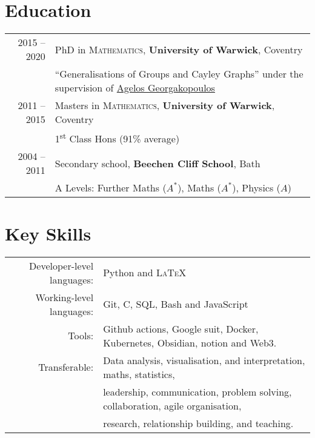 \documentclass[a4paper,10pt]{article}
\begin{document}
\section{Education}
\begin{tabular}{rl}
	\textsc{} 2015 -- 2020 & PhD in \textsc{Mathematics}, \textbf{University of Warwick}, Coventry\\
	& ``Generalisations of Groups and Cayley Graphs'' under the supervision of \href{https://homepages.warwick.ac.uk/~maslar/}{Agelos Georgakopoulos}\\
	\textsc{} 2011 -- 2015& Masters in \textsc{Mathematics}, \textbf{University of Warwick}, Coventry\\
	& 1\textsuperscript{st} Class Hons (91\% average)\\
	\textsc{} 2004 -- 2011& Secondary school, \textbf{Beechen Cliff School}, Bath\\
	&  A Levels: Further Maths ($A^{\ast}$), Maths ($A^{\ast}$), Physics ($A$)
\end{tabular}

\vspace{-0.05 in}

\section{Key Skills}
\begin{tabular}{rl}
	Developer-level languages: &  Python and \textsc{LaTeX}\\
	Working-level languages: & Git, C, SQL, Bash and JavaScript\\
	Tools: & Github actions, Google suit, Docker, Kubernetes, Obsidian, notion and Web3.\\
	Transferable: & Data analysis, visualisation, and interpretation, maths, statistics,\\
	& leadership, communication, problem solving, collaboration, agile organisation,\\
	& research, relationship building, and teaching.
\end{tabular}
\vspace{-0.05 in}
\end{document}
